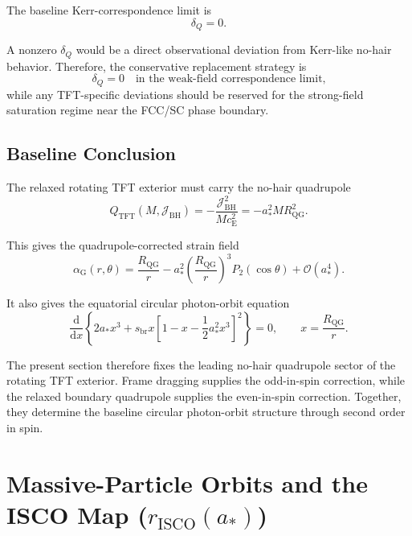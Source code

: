 The baseline Kerr-correspondence limit is
\begin{equation}
    \delta_Q=0.
\end{equation}

A nonzero $\delta_Q$ would be a direct observational deviation from Kerr-like no-hair behavior. Therefore, the conservative replacement strategy is
\begin{equation}
    \boxed{ \delta_Q=0 \quad \text{in the weak-field correspondence limit,} }
\end{equation}
while any TFT-specific deviations should be reserved for the strong-field saturation regime near the FCC/SC phase boundary.

\subsection{Baseline Conclusion}

The relaxed rotating TFT exterior must carry the no-hair quadrupole
\begin{equation}
    \boxed{ Q_{\mathrm{TFT}}(M,\mathcal{J}_{\mathrm{BH}}) = -\frac{\mathcal{J}_{\mathrm{BH}}^2}{M c_{\mathrm{E}}^2} = -a_\ast^2 M R_{\mathrm{QG}}^2. }
\end{equation}

This gives the quadrupole-corrected strain field
\begin{equation}
    \boxed{ \alpha_{\mathrm{G}}(r,\theta) = \frac{R_{\mathrm{QG}}}{r} - a_\ast^2 \left( \frac{R_{\mathrm{QG}}}{r} \right)^3 P_2(\cos\theta) + \mathcal{O}(a_\ast^4). }
\end{equation}

It also gives the equatorial circular photon-orbit equation
\begin{equation}
    \boxed{ \frac{\mathrm{d}}{\mathrm{d}x} \left\{ 2a_\ast x^3 + s_{\mathrm{br}} x \left[ 1 - x - \frac{1}{2}a_\ast^2x^3 \right]^2 \right\} = 0, \qquad x=\frac{R_{\mathrm{QG}}}{r}. }
\end{equation}

The present section therefore fixes the leading no-hair quadrupole sector of the rotating TFT exterior. Frame dragging supplies the odd-in-spin correction, while the relaxed boundary quadrupole supplies the even-in-spin correction. Together, they determine the baseline circular photon-orbit structure through second order in spin.

\section{Massive-Particle Orbits and the ISCO Map ($r_{\mathrm{ISCO}}(a_\ast)$)}

